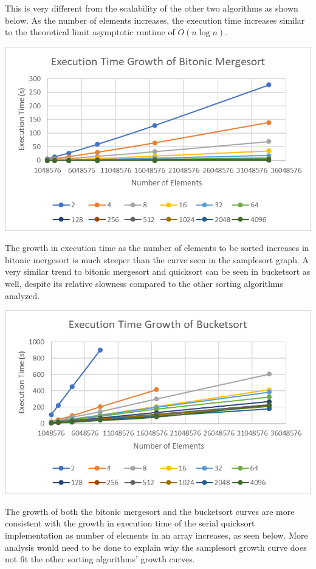 \documentclass[10pt,letterpaper]{article}
\begin{document}
\begin{multicols}{2}
This is very different from the scalability of the other two algorithms as shown below. As the number of elements increases, the execution time increases similar to the theoretical limit asymptotic runtime of $O(n \log n)$.

\begin{center}
\includegraphics[scale=1.3]{bitonic_growth}
\end{center}

The growth in execution time as the number of elements to be sorted increases in bitonic mergesort is much steeper than the curve seen in the samplesort graph. A very similar trend to bitonic mergesort and quicksort can be seen in bucketsort as well, despite its relative slowness compared to the other sorting algorithms analyzed.

\begin{center}
\includegraphics[scale=1.3]{bucket_growth}
\end{center}

The growth of both the bitonic mergesort and the bucketsort curves are more consistent with the growth in execution time of the serial quicksort implementation as number of elements in an array increases, as seen below. More analysis would need to be done to explain why the samplesort growth curve does not fit the other sorting algorithms' growth curves.


\end{multicols}
\end{document}
